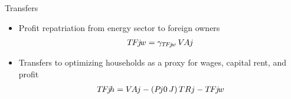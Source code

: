 \begin{frame}{Transfers}
  \begin{itemize}
    \item Profit repatriation from energy sector to foreign owners
    \begin{gather*}
      \TFjw = \gamma_{\TFjw} \, \VAj
    \end{gather*}
    \item Transfers to optimizing households as a proxy for wages, capital rent, and profit
    \begin{gather*}
      \TFjh = \VAj - (\Pj0 \, J) \, TRj - \TFjw
    \end{gather*}
  \end{itemize}
\end{frame}